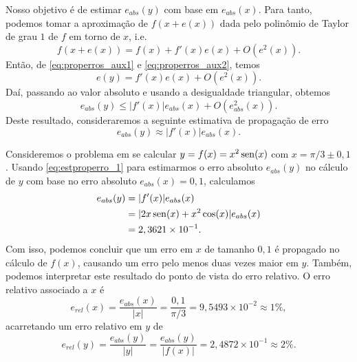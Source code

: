 Nosso objetivo é de estimar $e_{abs}(y)$ com base em $e_{abs}(x)$. Para tanto, podemos tomar a aproximação de $f(x+e(x))$ dada pelo polinômio de Taylor de grau $1$ de $f$ em torno de $x$, i.e.
\begin{equation}
  f(x+e(x)) = f(x) + f'(x)e(x) + O\left(e^2(x)\right).
\end{equation}
Então, de \eqref{eq:properros_aux1} e \eqref{eq:properros_aux2}, temos
\begin{equation}
  e(y) = f'(x)e(x) + O(e^2(x)).
\end{equation}
Daí, passando ao valor absoluto e usando a desigualdade triangular, obtemos
\begin{equation}
  e_{abs}(y) \leq |f'(x)|e_{abs}(x) + O\left(e_{abs}^2(x)\right).
\end{equation}
Deste resultado, consideraremos a seguinte estimativa de propagação de erro
\begin{equation}\label{eq:estproperro_1}
  e_{abs}(y) \approx |f'(x)|e_{abs}(x).
\end{equation}

\begin{ex}\label{ex:properro_1}
  Consideremos o problema em se calcular $y = f(x) = x^2\operatorname{sen}(x)$ com $x=\pi/3 \pm 0,1$. Usando \eqref{eq:estproperro_1} para estimarmos o erro absoluto $e_{abs}(y)$ no cálculo de $y$ com base no erro absoluto $e_{abs}(x)=0,1$, calculamos
  \begin{align}
    e_{abs}(y) &= |f'(x)|e_{abs}(x)\\
             &= |2x\operatorname{sen}(x) + x^2\cos(x)|e_{abs}(x)\\
             &= 2,3621\times 10^{-1}.
  \end{align}
Com isso, podemos concluir que um erro em $x$ de tamanho $0,1$ é propagado no cálculo de $f(x)$, causando um erro pelo menos duas vezes maior em $y$. Também, podemos interpretar este resultado do ponto de vista do erro relativo. O erro relativo associado a $x$ é
\begin{equation}
  e_{rel}(x) = \frac{e_{abs}(x)}{|x|} = \frac{0,1}{\pi/3} = 9,5493\times 10^{-2} \approx 1\%,
\end{equation}
acarretando um erro relativo em $y$ de
\begin{equation}
  e_{rel}(y) = \frac{e_{abs}(y)}{|y|} = \frac{e_{abs}(y)}{|f(x)|} = 2,4872\times 10^{-1} \approx 2\%.
\end{equation}

% 
\end{ex}

